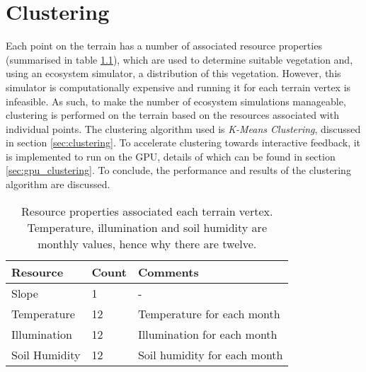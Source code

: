 \chapter{Clustering} \label{chap:clustering}

Each point on the terrain has a number of associated resource properties (summarised in table \ref{tab:point_resources}), which are used to determine suitable vegetation and, using an ecosystem simulator, a distribution of this vegetation. However, this simulator is computationally expensive and running it for each terrain vertex is infeasible. As such, to make the number of ecosystem simulations manageable, clustering is performed on the terrain based on the resources associated with individual points. The clustering algorithm used is \textit{K-Means Clustering}, discussed in section \ref{sec:clustering}. To accelerate clustering towards interactive feedback, it is implemented to run on the GPU, details of which can be found in section \ref{sec:gpu_clustering}. To conclude, the performance and results of the clustering algorithm are discussed.

\begin{table}[h]
  \centering
	    \begin{tabular}{|p{6cm}|p{3cm}|p{6cm}|}
		\hline	
  	    \textbf{Resource} & \textbf{Count} & \textbf{Comments} \\
  	    \hline	
  	    Slope & 1 & - \\
		\hline
  	    Temperature & 12 & Temperature for each month \\
		\hline
  	    Illumination & 12 & Illumination for each month \\
		\hline
  	    Soil Humidity & 12 & Soil humidity for each month \\
		\hline
		\end{tabular}
		\caption{Resource properties associated each terrain vertex. Temperature, illumination and soil humidity are monthly values, hence why there are twelve.}
	  \label{tab:point_resources}
\end{table}



